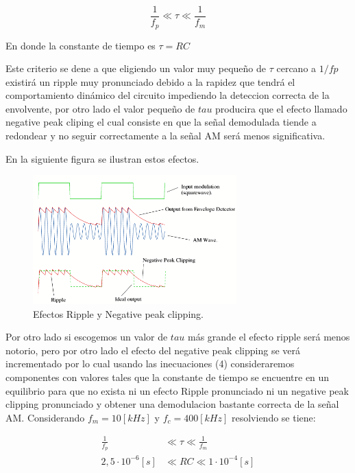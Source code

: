 \documentclass[letterpaper, titlepage]{article}
\begin{document}
\begin{enumerate}
\begin{equation}
 \frac{1}{f_{p}} \ll \tau \ll \frac{1}{f_{m}}
\end{equation}

En donde la constante de tiempo es $\tau = RC$

Este criterio se dene a que eligiendo un valor muy pequeño de $\tau$ cercano a $1/fp$ existirá un ripple muy pronunciado debido a la rapidez que tendrá el comportamiento dinámico del circuito impediendo la deteccion correcta de la envolvente, por otro lado el valor pequeño de $tau$ producira que el efecto llamado negative peak cliping el cual consiste en que la señal demodulada tiende a redondear y no seguir correctamente a la señal AM será menos significativa.

En la siguiente figura se ilustran estos efectos.	
		
\begin{figure}[H]
  \centering
    \includegraphics[width=0.7\textwidth]{demodulacion1}
  \caption{Efectos Ripple y Negative peak clipping.}
  \label{fig:ejemplo}
\end{figure}


Por otro lado si escogemos un valor de $tau$ más grande el efecto ripple será menos notorio, pero por otro lado el efecto del negative peak clipping se verá incrementado por lo cual usando las inecuaciones (4) consideraremos componentes con valores tales que la constante de tiempo se encuentre en un equilibrio 
para que no exista ni un efecto Ripple pronunciado ni un negative peak clipping pronunciado y obtener una demodulacion bastante correcta de la señal AM.
\newpage
Considerando $ f_{m} = 10[kHz] $ y $ f_{c} = 400[kHz] $ resolviendo se tiene:

\begin{align*}
\frac{1}{f_{p}}& \ll \tau \ll  \frac{1}{f_{m}} \\
2,5\cdot10^{-6} [s] &  \ll RC \ll  1\cdot10^{-4} [s] \\
\end{align*}


\end{enumerate}
\end{document}
